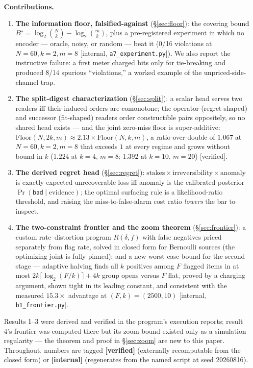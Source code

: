 \documentclass[11pt,a4paper]{article}
\begin{document}
\textbf{Contributions.}
\begin{enumerate}[leftmargin=1.6em]
\item \textbf{The information floor, falsified-against} (\S\ref{sec:floor}): the covering bound $B^\star=\log_2\binom{N}{k}-\log_2\binom{m}{k}$, plus a pre-registered experiment in which no encoder --- oracle, noisy, or random --- beat it (0/16 violations at $N{=}60,k{=}2,m{=}8$ [internal, \texttt{a7\_experiment.py}]). We also report the instructive failure: a first meter charged bits only for tie-breaking and produced 8/14 spurious ``violations,'' a worked example of the unpriced-side-channel trap.
\item \textbf{The split-digest characterization} (\S\ref{sec:split}): a scalar head serves two readers iff their induced orders are comonotone; the operator (regret-shaped) and successor (fit-shaped) readers order constructible pairs oppositely, so no shared head exists --- and the joint zero-miss floor is super-additive: $\mathrm{Floor}(N,2k,m)\approx 2.13\times\mathrm{Floor}(N,k,m)$, a ratio-over-double of $1.067$ at $N{=}60,k{=}2,m{=}8$ that exceeds $1$ at every regime and grows without bound in $k$ ($1.224$ at $k{=}4$, $m{=}8$; $1.392$ at $k{=}10$, $m{=}20$) [verified].
\item \textbf{The derived regret head} (\S\ref{sec:regret}): $\mathrm{stakes}\times\mathrm{irreversibility}\times\mathrm{anomaly}$ is exactly expected unrecoverable loss iff anomaly is the calibrated posterior $\Pr(\mathsf{bad}\mid\text{evidence})$; the optimal surfacing rule is a likelihood-ratio threshold, and raising the miss-to-false-alarm cost ratio \emph{lowers} the bar to inspect.
\item \textbf{The two-constraint frontier and the zoom theorem} (\S\ref{sec:frontier}): a custom rate--distortion program $R(\delta,f)$ with false negatives priced separately from flag rate, solved in closed form for Bernoulli sources (the optimizing joint is fully pinned); and a new worst-case bound for the second stage --- adaptive halving finds all $k$ positives among $F$ flagged items in at most $2k\lceil\log_2(F/k)\rceil+4k$ group opens versus $F$ flat, proved by a charging argument, shown tight in its leading constant, and consistent with the measured $15.3\times$ advantage at $(F,k)=(2500,10)$ [internal, \texttt{b1\_frontier.py}].
\end{enumerate}
Results 1--3 were derived and verified in the program's execution reports; result 4's frontier was computed there but its zoom bound existed only as a simulation regularity --- the theorem and proof in \S\ref{sec:zoom} are new to this paper. Throughout, numbers are tagged \textbf{[verified]} (externally recomputable from the closed form) or \textbf{[internal]} (regenerates from the named script at seed 20260816).
\end{document}
